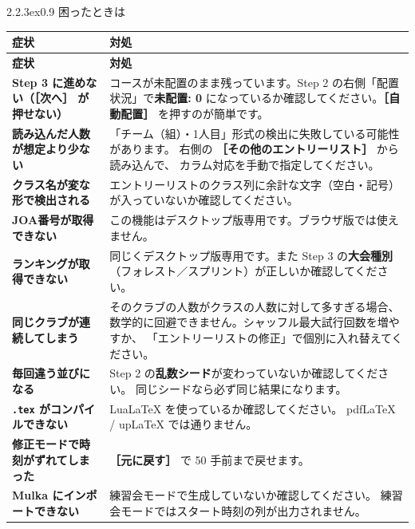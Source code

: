 \documentclass[a4paper,11pt]{ltjsarticle}
\makeatletter
\renewcommand{\section}{\@startsection{section}{1}{\z@}%
  {2.2\baselineskip \@plus .3ex}{0.9\baselineskip}%
  {\normalfont\Large\bfseries\color{brandink}}}
\newcommand{\ui}[1]{\textcolor{brand}{\textbf{［#1］}}}
\newcommand{\fn}[1]{\texttt{#1}}
\makeatother
\begin{document}
\section{困ったときは}

\begin{center}
\begin{longtable}{@{}>{\bfseries}p{58mm}p{86mm}@{}}
\toprule
\rowcolor{band}\textbf{症状} & \textbf{対処} \\
\midrule
\endfirsthead
\rowcolor{band}\textbf{症状} & \textbf{対処} \\
\midrule
\endhead
Step 3 に進めない（\ui{次へ} が押せない） &
コースが未配置のまま残っています。Step 2 の右側「配置状況」で\textbf{未配置: 0}
になっているか確認してください。\ui{自動配置} を押すのが簡単です。 \\

読み込んだ人数が想定より少ない &
「チーム（組）・1人目」形式の検出に失敗している可能性があります。
右側の \ui{その他のエントリーリスト} から読み込んで、
カラム対応を手動で指定してください。 \\

クラス名が変な形で検出される &
エントリーリストのクラス列に余計な文字（空白・記号）が入っていないか確認してください。 \\

JOA番号が取得できない &
この機能はデスクトップ版専用です。ブラウザ版では使えません。 \\

ランキングが取得できない &
同じくデスクトップ版専用です。また Step 3 の\textbf{大会種別}
（フォレスト／スプリント）が正しいか確認してください。 \\

同じクラブが連続してしまう &
そのクラブの人数がクラスの人数に対して多すぎる場合、
数学的に回避できません。シャッフル最大試行回数を増やすか、
「エントリーリストの修正」で個別に入れ替えてください。 \\

毎回違う並びになる &
Step 2 の\textbf{乱数シード}が変わっていないか確認してください。
同じシードなら必ず同じ結果になります。 \\

\fn{.tex} がコンパイルできない &
LuaLaTeX を使っているか確認してください。
pdfLaTeX / upLaTeX では通りません。 \\

修正モードで時刻がずれてしまった &
\ui{元に戻す} で 50 手前まで戻せます。 \\

Mulka にインポートできない &
練習会モードで生成していないか確認してください。
練習会モードではスタート時刻の列が出力されません。 \\
\bottomrule
\end{longtable}
\end{center}
\end{document}
